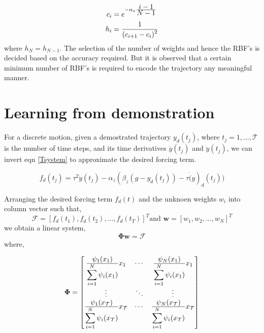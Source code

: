 \begin{align}
    c_i &= e^{-\alpha_x \frac{\displaystyle i-1}{\displaystyle N-1}}\\
    h_i &= \frac{\displaystyle 1}{\displaystyle (c_{i+1} - c_i)^2}
\end{align}
where $h_N = h_{N-1}$. The selection of the number of weights and hence the RBF's is decided based on the accuracy required.
But it is observed that a certain minimum number of RBF's is required to encode the trajectory any meaningful manner.

\section{Learning from demonstration}
For a discrete motion, given a demostrated trajectory $y_d(t_j)$, where $t_j = 1, \dots , \mathcal{T}$ is the number of time steps, and 
its time derivatives $\dot{y}(t_j)$ and $\ddot{y}(t_j)$, we can invert eqn \eqref{Tsystem} to approximate
the desired forcing term.

\begin{equation}
    f_d(t_j) = \tau^2 \ddot{y}(t_j) - \alpha_z (\beta_z (g - y_d(t_j))  - \tau \dot(y)_d(t_j)) \label{inverseDMP}
\end{equation}

Arranging the desired forcing term $f_d(t)$ and the unknoen weights $w_i$ into column vector such that, 
\[ 
 \bm{\mathcal{F}} = \left[ f_d(t_1), f_d(t_2), \dots , f_d(t_T) \right]^T 
    \text{and  }   \boldsymbol{w} = \left[ w_1, w_2, \dots , w_N \right]^T  
        \]
we obtain a linear system, 
\begin{equation}
    \boldsymbol{\Phi} \boldsymbol{w} = \bm{\mathcal{F}}
\end{equation}
where,

\begin{equation}
\boldsymbol{\Phi} = 
\begin{bmatrix}
 \frac{\displaystyle \psi_1(x_1)}{\displaystyle \sum\limits_{i=1}^{N} \psi_i(x_1)}x_1 & \cdots & \frac{\displaystyle \psi_N(x_1)}{\displaystyle \sum\limits_{i=1}^{N} \psi_i(x_1)}x_1 \\
\vdots & \ddots & \vdots \\
\frac{\displaystyle \psi_1(x_\mathcal{T})}{\displaystyle \sum\limits_{i=1}^{N} \psi_i(x_\mathcal{T})}x_\mathcal{T} & \cdots & \frac{\displaystyle \psi_N(x_\mathcal{T})}{\displaystyle \sum\limits_{i=1}^{N} \psi_i(x_\mathcal{T})}x_\mathcal{T} 
               
\end{bmatrix}
\end{equation}

